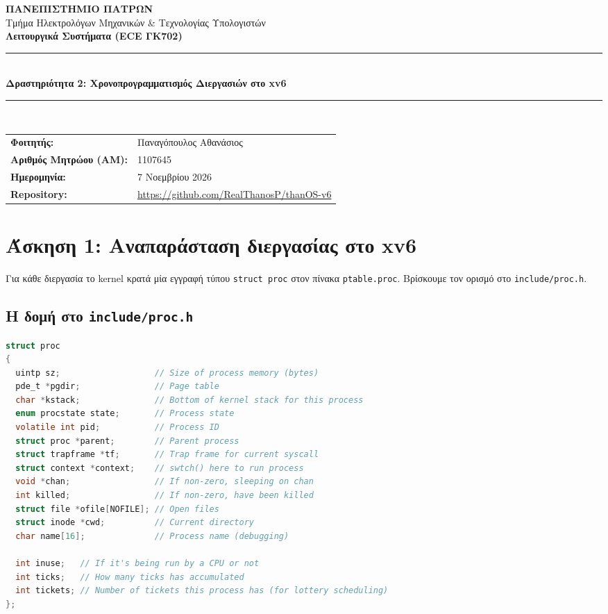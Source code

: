 \documentclass[11pt,a4paper]{article}
\begin{document}
\begin{center}
    {\large \textbf{ΠΑΝΕΠΙΣΤΗΜΙΟ ΠΑΤΡΩΝ}}\\[1mm]
    {\normalsize Τμήμα Ηλεκτρολόγων Μηχανικών \& Τεχνολογίας Υπολογιστών}\\[3mm]
    {\large \textbf{Λειτουργικά Συστήματα (ECE ΓΚ702)}}\\[1mm]
    \rule{\textwidth}{0.8pt}\\[3mm]
    {\LARGE \textbf{Δραστηριότητα 2: Χρονοπρογραμματισμός Διεργασιών στο xv6}}\\[2mm]
    \rule{\textwidth}{0.8pt}\\[3mm]
    \begin{tabular}{ll}
        \textbf{Φοιτητής:} & Παναγόπουλος Αθανάσιος \\
        \textbf{Αριθμός Μητρώου (ΑΜ):} & 1107645 \\
        \textbf{Ημερομηνία:} & 7 Νοεμβρίου 2026 \\
        \textbf{Repository:} & \url{https://github.com/RealThanosP/thanOS-v6} \\
    \end{tabular}
\end{center}
\vspace{2mm}


\section{Άσκηση 1: Αναπαράσταση διεργασίας στο xv6}

Για κάθε διεργασία το kernel κρατά μία εγγραφή τύπου \texttt{struct proc} στον πίνακα \texttt{ptable.proc}. Βρίσκουμε τον ορισμό στο \texttt{include/proc.h}.

\subsection*{Η δομή στο \texttt{include/proc.h}}
\begin{lstlisting}[language=C,firstnumber=93,basicstyle=\ttfamily\scriptsize,lineskip=-0.7pt]
struct proc
{
  uintp sz;                   // Size of process memory (bytes)
  pde_t *pgdir;               // Page table
  char *kstack;               // Bottom of kernel stack for this process
  enum procstate state;       // Process state
  volatile int pid;           // Process ID
  struct proc *parent;        // Parent process
  struct trapframe *tf;       // Trap frame for current syscall
  struct context *context;    // swtch() here to run process
  void *chan;                 // If non-zero, sleeping on chan
  int killed;                 // If non-zero, have been killed
  struct file *ofile[NOFILE]; // Open files
  struct inode *cwd;          // Current directory
  char name[16];              // Process name (debugging)

  int inuse;   // If it's being run by a CPU or not
  int ticks;   // How many ticks has accumulated
  int tickets; // Number of tickets this process has (for lottery scheduling)
};
\end{lstlisting}
\end{document}
